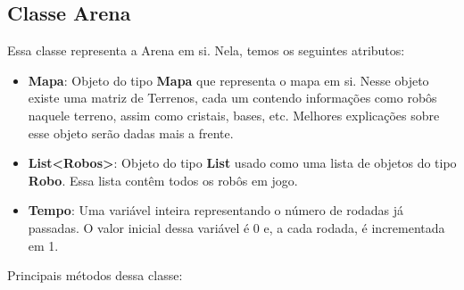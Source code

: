 \documentclass[11pt]{article}
\begin{document}
\subsection{Classe Arena}


Essa classe representa a Arena em si. Nela, temos os seguintes atributos:

\begin{itemize}

	\item \textbf{Mapa}: Objeto do tipo \textbf{\color{red}Mapa} que representa o mapa em si. Nesse objeto existe uma matriz de Terrenos, cada um contendo informações como robôs naquele terreno, assim como cristais, bases, etc. Melhores explicações sobre esse objeto serão dadas mais a frente.
	
	\item \textbf{List<{\color{red}Robos}>}: Objeto do tipo \textbf{\color{red}List} usado como uma lista de objetos do tipo \textbf{\color{red}Robo}. Essa lista contêm todos os robôs em jogo.
	
	\item \textbf{Tempo}: Uma variável inteira representando o número de rodadas já passadas. O valor inicial dessa variável é 0 e, a cada rodada, é incrementada em 1.

\end{itemize}

Principais métodos dessa classe:
\end{document}
